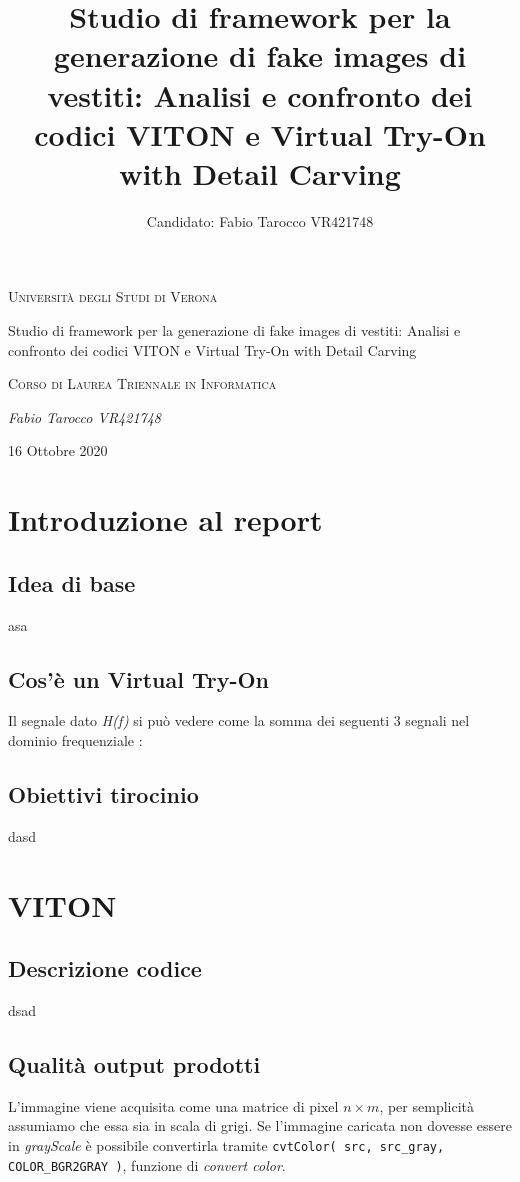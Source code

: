 \documentclass[final, 11pt]{article}
\title{Studio di framework per la generazione di fake images di vestiti: Analisi e confronto dei codici VITON e Virtual Try-On with Detail Carving}
\author{ Candidato: Fabio Tarocco VR421748}
\begin{document}
	\clearpage
	
\begin{titlepage}
	\centering
	\vspace*{\fill}
	{\scshape\LARGE Università degli Studi di Verona \par}
	\vspace{1.5cm}
	{\huge Studio di framework per la generazione di fake images di vestiti: Analisi e confronto dei codici VITON e Virtual Try-On with Detail Carving \par}
	\vspace{0.5cm}
	{\scshape  Corso di Laurea Triennale in Informatica \par}
	\vspace{1cm}
	{\Large\itshape Fabio Tarocco VR421748 \par}
	\vspace{1cm}
	\vspace{5cm}
	\vspace*{\fill}
	{\large 16 Ottobre 2020 \par}
\end{titlepage}
	\newpage
	\thispagestyle{plain} %
	\mbox{}
	\clearpage
	
	\tableofcontents
	\newpage
	\section{Introduzione al report}
	\subsection{Idea di base}
	asa
	\subsection{Cos'è un Virtual Try-On}
	Il segnale dato \textit{H(f)} si può vedere come la somma dei seguenti 3 segnali nel dominio frequenziale :
	\subsection {Obiettivi tirocinio}
	dasd
	
	\newpage
	\section{VITON}
	\subsection{Descrizione codice}
	dsad
	\subsection{Qualità output prodotti}	
	L'immagine viene acquisita come una matrice di pixel $ n \times m $, per semplicità assumiamo che essa sia in scala di grigi. Se l'immagine caricata non dovesse essere in \textit{grayScale} è possibile convertirla tramite \texttt{cvtColor( src, src\_gray, COLOR\_BGR2GRAY )}, funzione di \textit{convert color}.
	
\end{document}
